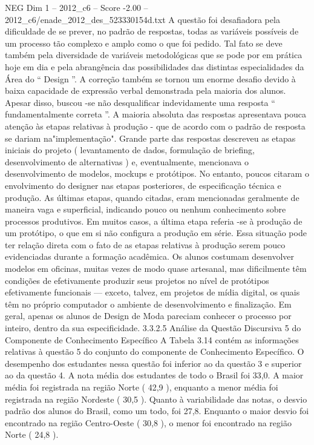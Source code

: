 \begin{textsample}{NEG Dim 1 – 2012\_c6 – Score -2.00 – 2012\_c6/enade\_2012\_des\_523330154d.txt}
A questão foi desafiadora pela dificuldade de se prever, no padrão de respostas, todas as variáveis possíveis de um processo tão complexo e amplo como o que foi pedido.
Tal fato se deve também pela diversidade de variáveis metodológicas que se pode por em prática hoje em dia e pela abrangência das possibilidades das distintas especialidades da Área do “ Design ”.
A correção também se tornou um enorme desafio devido à baixa capacidade de expressão verbal demonstrada pela maioria dos alunos.
Apesar disso, buscou -se não desqualificar indevidamente uma resposta “ fundamentalmente correta ”.
A maioria absoluta das respostas apresentava pouca atenção às etapas relativas à produção - que de acordo com o padrão de resposta se dariam na"implementação".
Grande parte das respostas descreveu as etapas iniciais do projeto ( levantamento de dados, formulação de briefing, desenvolvimento de alternativas ) e, eventualmente, mencionava o desenvolvimento de modelos, mockups e protótipos.
No entanto, poucos citaram o envolvimento do designer nas etapas posteriores, de especificação técnica e produção.
As últimas etapas, quando citadas, eram mencionadas geralmente de maneira vaga e superficial, indicando pouco ou nenhum conhecimento sobre processos produtivos.
Em muitos casos, a última etapa referia -se à produção de um protótipo, o que em si não configura a produção em série.
Essa situação pode ter relação direta com o fato de as etapas relativas à produção serem pouco evidenciadas durante a formação acadêmica.
Os alunos costumam desenvolver modelos em oficinas, muitas vezes de modo quase artesanal, mas dificilmente têm condições de efetivamente produzir seus projetos no nível de protótipos efetivamente funcionais — exceto, talvez, em projetos de mídia digital, os quais têm no próprio computador o ambiente de desenvolvimento e finalização.
Em geral, apenas os alunos de Design de Moda pareciam conhecer o processo por inteiro, dentro da sua especificidade. 3.3.2.5 Análise da Questão Discursiva 5 do Componente de Conhecimento Específico A Tabela 3.14 contém as informações relativas à questão 5 do conjunto do componente de Conhecimento Específico.
O desempenho dos estudantes nessa questão foi inferior ao da questão 3 e superior ao da questão 4.
A nota média dos estudantes de todo o Brasil foi 33,0.
A maior média foi registrada na região Norte ( 42,9 ), enquanto a menor média foi registrada na região Nordeste ( 30,5 ).
Quanto à variabilidade das notas, o desvio padrão dos alunos do Brasil, como um todo, foi 27,8.
Enquanto o maior desvio foi encontrado na região Centro-Oeste ( 30,8 ), o menor foi encontrado na região Norte ( 24,8 ).

\end{textsample}
